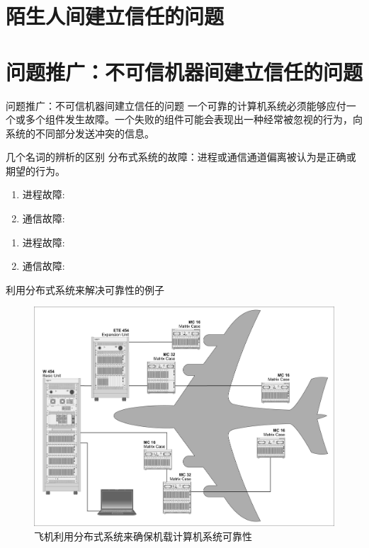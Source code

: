 \documentclass[11pt]{beamer}
\begin{document}
\section{陌生人间建立信任的问题}

\section{问题推广：不可信机器间建立信任的问题}
\begin{frame}{问题推广：不可信机器间建立信任的问题}
	一个可靠的计算机系统必须能够应付一个或多个组件发生故障。一个失败的组件可能会表现出一种经常被忽视的行为，向系统的不同部分发送冲突的信息。
\end{frame}

\begin{frame}{几个名词的辨析的区别}
	分布式系统的故障：进程或通信通道偏离被认为是正确或期望的行为。
	\begin{enumerate}
		\item 进程故障: 
		\item 通信故障:
		\end{enumerate}
	
	\begin{enumerate}
		\item 进程故障: 
		\item 通信故障:
	\end{enumerate}
\end{frame}

\begin{frame}{利用分布式系统来解决可靠性的例子}
	\begin{figure}
		\centering
		\includegraphics[width=0.7\linewidth]{figures/distributedPlane}
		\caption{飞机利用分布式系统来确保机载计算机系统可靠性}
		\label{fig:distributedplane}
	\end{figure}
	
\end{frame}
\end{document}
